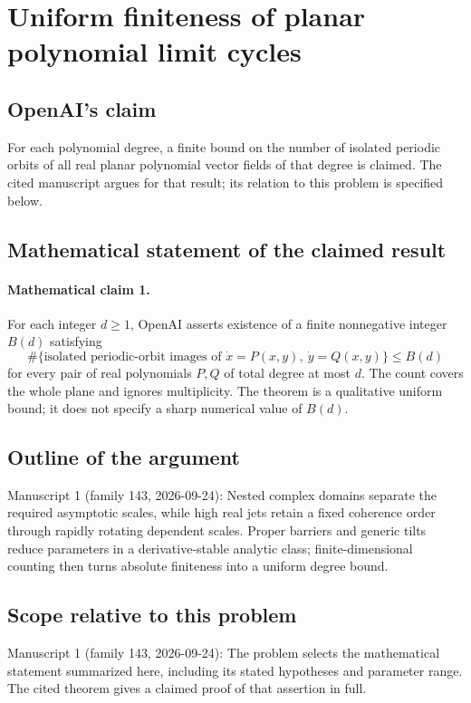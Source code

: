 \documentclass[11pt]{article}
\begin{document}
\section*{Uniform finiteness of planar polynomial limit cycles}

\subsection{OpenAI's claim}
For each polynomial degree, a finite bound on the number of isolated periodic orbits of all real planar polynomial vector fields of that degree is claimed. The cited manuscript argues for that result; its relation to this problem is specified below.

\subsection{Mathematical statement of the claimed result}
\paragraph{Mathematical claim 1.} For each integer $d\ge1$, OpenAI asserts existence of a finite nonnegative integer $B(d)$ satisfying
\[
\#\{\text{isolated periodic-orbit images of }\dot x=P(x,y),\ \dot y=Q(x,y)\}\le B(d)
\]
for every pair of real polynomials $P,Q$ of total degree at most $d$. The count covers the whole plane and ignores multiplicity. The theorem is a qualitative uniform bound; it does not specify a sharp numerical value of $B(d)$.

\subsection{Outline of the argument}
Manuscript 1 (family 143, 2026-09-24): Nested complex domains separate the required asymptotic scales, while high real jets retain a fixed coherence order through rapidly rotating dependent scales. Proper barriers and generic tilts reduce parameters in a derivative-stable analytic class; finite-dimensional counting then turns absolute finiteness into a uniform degree bound.

\subsection{Scope relative to this problem}
Manuscript 1 (family 143, 2026-09-24): The problem selects the mathematical statement summarized here, including its stated hypotheses and parameter range. The cited theorem gives a claimed proof of that assertion in full.
\end{document}
